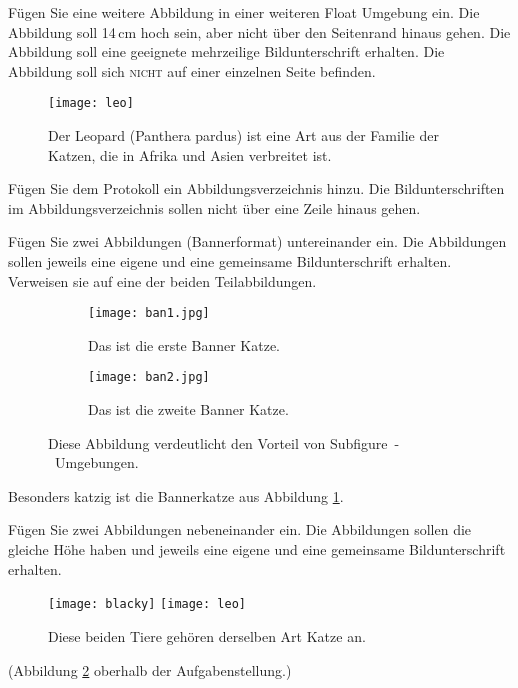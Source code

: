 \pagebreak
\begin{aufgabe}
F\"ugen Sie eine weitere Abbildung in einer weiteren  Float Umgebung ein. 
Die Abbildung soll 14\,cm hoch sein, aber nicht \"uber den Seitenrand hinaus gehen. 
Die Abbildung soll eine geeignete mehrzeilige Bildunterschrift erhalten. 
Die Abbildung soll sich \textsc{nicht} auf einer einzelnen Seite befinden.
\end{aufgabe}

\FloatBarrier
\begin{figure}[h]
\texttt{[image: leo]}
\caption[Der Leopard (Panthera pardus)]
	{Der Leopard (Panthera pardus) ist eine Art aus der Familie der Katzen, die in Afrika und Asien verbreitet ist.}
\end{figure}
\FloatBarrier


\begin{aufgabe}
F\"ugen Sie dem Protokoll ein Abbildungsverzeichnis hinzu. Die Bildunterschriften im Abbildungsverzeichnis sollen nicht \"uber eine Zeile hinaus gehen.
\end{aufgabe}

\pagebreak
\begin{aufgabe}
F\"ugen Sie zwei Abbildungen (Bannerformat) untereinander ein. 
Die Abbildungen sollen jeweils eine eigene und eine gemeinsame Bildunterschrift erhalten. 
Verweisen sie auf eine der beiden Teilabbildungen.

\begin{figure}[h]
 \begin{subfigure}[h]{\textwidth}
  \texttt{[image: ban1.jpg]}
  \caption{Das ist die erste Banner Katze.}
  \label{abb:banner1}
 \end{subfigure}
 
 \begin{subfigure}[h]{\textwidth}
  \texttt{[image: ban2.jpg]}
    \caption{Das ist die zweite Banner Katze.}
 \end{subfigure}
  
 \caption{Diese Abbildung verdeutlicht den Vorteil von Subfigure~-~Umgebungen.}
\end{figure}
\end{aufgabe}
\FloatBarrier
Besonders katzig ist die Bannerkatze aus Abbildung \ref{abb:banner1}.

\pagebreak
\begin{aufgabe}
F\"ugen Sie zwei Abbildungen nebeneinander ein. Die Abbildungen sollen die gleiche H\"ohe haben und jeweils eine eigene und eine gemeinsame Bildunterschrift erhalten.

\begin{figure}
 \centering
 \texttt{[image: blacky]}
 \texttt{[image: leo]}
\caption{Diese beiden Tiere gehören derselben Art Katze an.}
\label{img:nebeneinander}
\end{figure}
\end{aufgabe}
\noindent (Abbildung \ref{img:nebeneinander} oberhalb der Aufgabenstellung.)


